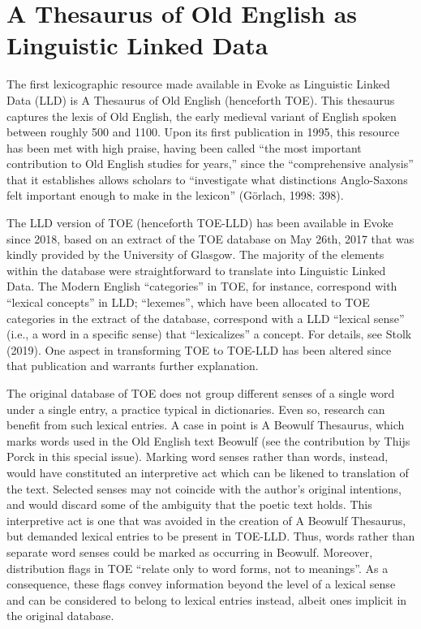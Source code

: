 \section{A Thesaurus of Old English as Linguistic Linked Data}

The first lexicographic resource made available in Evoke as Linguistic Linked Data (LLD) is A Thesaurus of Old English (henceforth TOE). This thesaurus captures the lexis of Old English, the early medieval variant of English spoken between roughly 500 and 1100. Upon its first publication in 1995, this resource has been met with high praise, having been called “the most important contribution to Old English studies for years,” since the “comprehensive analysis” that it establishes allows scholars to “investigate what distinctions Anglo-Saxons felt important enough to make in the lexicon” (Görlach, 1998: 398). 

The LLD version of TOE (henceforth TOE-LLD) has been available in Evoke since 2018, based on an extract of the TOE database on May 26th, 2017 that was kindly provided by the University of Glasgow. The majority of the elements within the database were straightforward to translate into Linguistic Linked Data. The Modern English “categories” in TOE, for instance, correspond with “lexical concepts” in LLD; “lexemes”, which have been allocated to TOE categories in the extract of the database, correspond with a LLD “lexical sense” (i.e., a word in a specific sense) that “lexicalizes” a concept.  For details, see Stolk (2019).  One aspect in transforming TOE to TOE-LLD has been altered since that publication and warrants further explanation.

The original database of TOE does not group different senses of a single word under a single entry, a practice typical in dictionaries. Even so, research can benefit from such lexical entries. A case in point is A Beowulf Thesaurus, which marks words used in the Old English text Beowulf (see the contribution by Thijs Porck in this special issue). Marking word senses rather than words, instead, would have constituted an interpretive act which can be likened to translation of the text. Selected senses may not coincide with the author’s original intentions, and would discard some of the ambiguity that the poetic text holds. This interpretive act is one that was avoided in the creation of A Beowulf Thesaurus, but demanded lexical entries to be present in TOE-LLD. Thus, words rather than separate word senses could be marked as occurring in Beowulf. Moreover, distribution flags in TOE “relate only to word forms, not to meanings”.  As a consequence, these flags convey information beyond the level of a lexical sense and can be considered to belong to lexical entries instead, albeit ones implicit in the original database.

